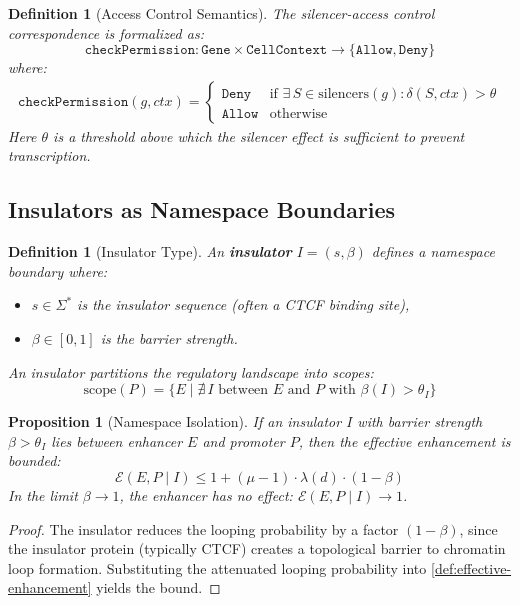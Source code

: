 \documentclass[12pt,a4paper]{article}
\newtheorem{proposition}[theorem]{Proposition}
\newtheorem{definition}[theorem]{Definition}
\begin{document}
\begin{definition}[Access Control Semantics]\label{def:access-control}
The silencer-access control correspondence is formalized as:
\[
\texttt{checkPermission} : \texttt{Gene} \times \texttt{CellContext} \to \{\texttt{Allow}, \texttt{Deny}\}
\]
where:
\begin{align}
\texttt{checkPermission}(g, ctx) = \begin{cases}
  \texttt{Deny} & \text{if } \exists\, S \in \text{silencers}(g) : \delta(S, ctx) > \theta \\
  \texttt{Allow} & \text{otherwise}
\end{cases}
\end{align}
Here $\theta$ is a threshold above which the silencer effect is sufficient to prevent transcription.
\end{definition}

\subsection{Insulators as Namespace Boundaries}

\begin{definition}[Insulator Type]\label{def:insulator}
An \textbf{insulator} $I = (s, \beta)$ defines a \emph{namespace boundary} where:
\begin{itemize}
  \item $s \in \Sigma^*$ is the insulator sequence (often a CTCF binding site),
  \item $\beta \in [0,1]$ is the \emph{barrier strength}.
\end{itemize}
An insulator partitions the regulatory landscape into scopes:
\[
\text{scope}(P) = \{E \mid \nexists\, I \text{ between } E \text{ and } P \text{ with } \beta(I) > \theta_I\}
\]
\end{definition}

\begin{proposition}[Namespace Isolation]\label{prop:namespace-isolation}
If an insulator $I$ with barrier strength $\beta > \theta_I$ lies between enhancer $E$ and promoter $P$, then the effective enhancement is bounded:
\[
\mathcal{E}(E, P \mid I) \leq 1 + (\mu - 1) \cdot \lambda(d) \cdot (1 - \beta)
\]
In the limit $\beta \to 1$, the enhancer has no effect: $\mathcal{E}(E, P \mid I) \to 1$.
\end{proposition}

\begin{proof}
The insulator reduces the looping probability by a factor $(1 - \beta)$, since the insulator protein (typically CTCF) creates a topological barrier to chromatin loop formation.  Substituting the attenuated looping probability into \cref{def:effective-enhancement} yields the bound.
\end{proof}
\end{document}

